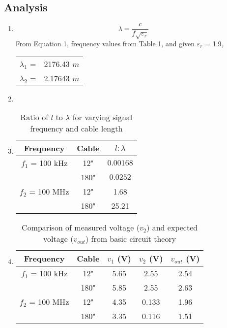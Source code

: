 \documentclass{article}
\begin{document}
\subsection{Analysis}
\begin{enumerate}
	\item 
	\begin{equation}
		\lambda = \frac{c}{f\sqrt{\varepsilon_{r}}}
	\end{equation}
	From Equation 1, frequency values from Table 1, and given $\varepsilon_{r}$ = 1.9,
	\begin{table}[h]
	\centering
		\begin{tabular}{rl}
		$\lambda_{1}$ =  & 2176.43 $m$  \\
		$\lambda_{2}$ =  & 2.17643 $m$      
		\end{tabular}
	\end{table}
	
	\item
	\item
	\begin{table}[H]
		\centering
		\begin{tabular}{|c|c|c|}
		\hline
		\textbf{Frequency} & \textbf{Cable}  & $l:\lambda$   \\ \hline
		$f_1$ = 100 kHz    & 12"             & $0.00168$     \\ \hline
		                   & 180"            & $0.0252$      \\ \hline
		$f_2$ = 100 MHz    & 12"             & 1.68          \\ \hline
		                   & 180"            & 25.21         \\ \hline
		\end{tabular}
		\caption{Ratio of $l$ to $\lambda$ for varying signal frequency and cable length}
		\label{Analysis 1.2}
	\end{table}
	\pagebreak
	
	\item
	\begin{table}[h]
	\centering
		\begin{tabular}{|c|c|c|c|c|}
		\hline
		\textbf{Frequency} & \textbf{Cable} & $v_1$ (V) & $v_2$ (V) & $v_{out}$ (V) \\ \hline
		$f_1$ = 100 kHz    & 12"            & 5.65      & 2.55      & 2.54          \\ \hline
		                   & 180"           & 5.85      & 2.55      & 2.63     	   \\ \hline
		$f_2$ = 100 MHz    & 12"            & 4.35      & 0.133     & 1.96          \\ \hline
		                   & 180"           & 3.35      & 0.116     & 1.51          \\ \hline
		\end{tabular}
		\caption{Comparison of measured voltage ($v_2$) and expected voltage ($v_{out}$) from basic circuit theory}
		\label{Analysis 1.3}
	\end{table}
	

\end{enumerate}
\end{document}
